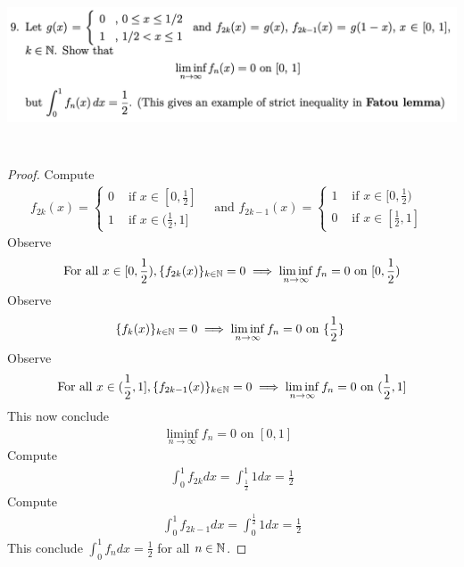\documentclass{report}
\begin{document}
\begin{question}{}{}
\includegraphics[height=5cm,width=18cm]{hw6a9}
\end{question}
\begin{proof}

Compute 
\begin{align*}
f_{2k}(x)=\begin{cases}
  0& \text{ if $x\in [0,\frac{1}{2}]$ }\\
  1& \text{ if $x\in (\frac{1}{2},1]$ }
\end{cases}\text{ and }f_{2k-1}(x)=\begin{cases}
  1& \text{ if $x\in [0,\frac{1}{2})$ }\\
  0& \text{ if $x \in [\frac{1}{2},1]$ }
\end{cases}
\end{align*}
Observe 
\begin{align*}
\text{ For all }x \in [0,\frac{1}{2}),\{ f_{2k}(x) \}_{k\in\mathbb{N}}=0\implies \liminf_{n\to\infty} f_n=0\text{ on $[0,\frac{1}{2})$ }
\end{align*}
Observe 
\begin{align*}
\{ f_k(x) \}_{k\in\mathbb{N}}=0\implies \liminf_{n\to\infty} f_n=0\text{ on $\{ \frac{1}{2} \}$ }
\end{align*}
Observe 
\begin{align*}
  \text{ For all }x \in (\frac{1}{2},1],\{ f_{2k-1}(x) \}_{k\in\mathbb{N}}=0\implies \liminf_{n\to\infty} f_n=0\text{ on $(\frac{1}{2},1]$ }
\end{align*}
This now conclude 
\begin{align*}
\liminf_{n\to\infty} f_n=0\text{ on $[0,1]$ }
\end{align*}
Compute
\begin{align*}
\int_0^1 f_{2k}dx=\int_{\frac{1}{2}}^1 1dx=\frac{1}{2}
\end{align*}
Compute 
\begin{align*}
\int_0^1 f_{2k-1}dx= \int_0^{\frac{1}{2}}1dx=\frac{1}{2}
\end{align*}
This conclude $\int_0^1 f_ndx=\frac{1}{2}$ for all $n\in\mathbb{N}$.
\end{proof}
\end{document}
